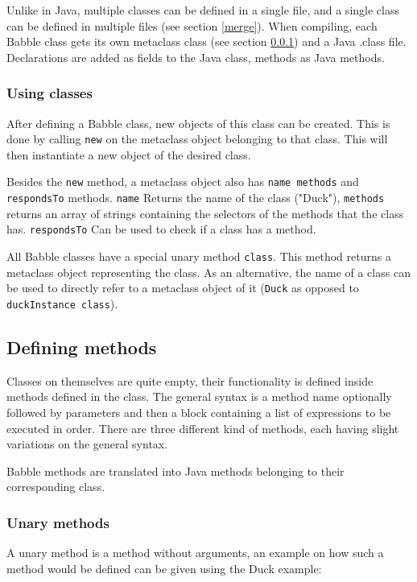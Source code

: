 \documentclass[a4paper]{article}
\begin{document}
Unlike in Java, multiple classes can be defined in a single file, and a single class can be defined in multiple files (see section \ref{merge}). When compiling, each Babble class gets its own metaclass class (see section \ref{metaclass}) and a Java .class file. Declarations are added as fields to the Java class, methods as Java methods.

\subsubsection{Using classes}
\label{metaclass}
After defining a Babble class, new objects of this class can be created. This is done by calling \verb|new| on the metaclass object belonging to that class. This will then instantiate a new object of the desired class.

Besides the \verb|new| method, a metaclass object also has \verb|name methods| and \verb|respondsTo| methods. \verb|name| Returns the name of the class ("Duck"), \verb|methods| returns an array of strings containing the selectors of the methods that the class has. \verb|respondsTo| Can be used to check if a class has a method.

All Babble classes have a special unary method \verb|class|. This method returns a metaclass object representing the class. As an alternative, the name of a class can be used to directly refer to a metaclass object of it (\verb|Duck| as opposed to \verb|duckInstance class|).


\subsection{Defining methods}

Classes on themselves are quite empty, their functionality is defined inside methods defined in the class. The general syntax is a method name optionally followed by parameters and then a block containing a list of expressions to be executed in order.
There are three different kind of methods, each having slight variations on the general syntax.

Babble methods are translated into Java methods belonging to their corresponding class.


\subsubsection{Unary methods}

A unary method is a method without arguments, an example on how such a method would be defined can be given using the Duck example:
\end{document}
